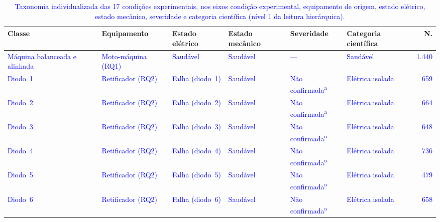 \documentclass[times,final]{elsarticle}
\begin{document}
\begin{table}[H]
    \centering
    \footnotesize
    \caption{\textcolor{blue}{Taxonomia individualizada das 17 condições experimentais, nos eixos condição experimental, equipamento de origem, estado elétrico, estado mecânico, severidade e categoria científica (nível 1 da leitura hierárquica).}}
    \label{tab:res_taxonomia_hierarquica}
    \begin{tabular}{@{}p{3.4cm}p{1.9cm}p{2.0cm}p{2.3cm}p{1.7cm}p{1.7cm}r@{}}
        \toprule
        \textbf{Classe} & \textbf{Equipamento} & \textbf{Estado elétrico} & \textbf{Estado mecânico} & \textbf{Severidade} & \textbf{Categoria científica} & \textbf{N.} \\
        \midrule
        \textcolor{blue}{Máquina balanceada e alinhada} & \textcolor{blue}{Moto-máquina (RQ1)} & \textcolor{blue}{Saudável} & \textcolor{blue}{Saudável} & \textcolor{blue}{---} & \textcolor{blue}{Saudável} & \textcolor{blue}{1.440} \\
        \addlinespace
        \textcolor{blue}{Diodo~1} & \textcolor{blue}{Retificador (RQ2)} & \textcolor{blue}{Falha (diodo~1)} & \textcolor{blue}{Saudável} & \textcolor{blue}{Não confirmada\textsuperscript{a}} & \textcolor{blue}{Elétrica isolada} & \textcolor{blue}{659} \\
        \textcolor{blue}{Diodo~2} & \textcolor{blue}{Retificador (RQ2)} & \textcolor{blue}{Falha (diodo~2)} & \textcolor{blue}{Saudável} & \textcolor{blue}{Não confirmada\textsuperscript{a}} & \textcolor{blue}{Elétrica isolada} & \textcolor{blue}{664} \\
        \textcolor{blue}{Diodo~3} & \textcolor{blue}{Retificador (RQ2)} & \textcolor{blue}{Falha (diodo~3)} & \textcolor{blue}{Saudável} & \textcolor{blue}{Não confirmada\textsuperscript{a}} & \textcolor{blue}{Elétrica isolada} & \textcolor{blue}{648} \\
        \textcolor{blue}{Diodo~4} & \textcolor{blue}{Retificador (RQ2)} & \textcolor{blue}{Falha (diodo~4)} & \textcolor{blue}{Saudável} & \textcolor{blue}{Não confirmada\textsuperscript{a}} & \textcolor{blue}{Elétrica isolada} & \textcolor{blue}{736} \\
        \textcolor{blue}{Diodo~5} & \textcolor{blue}{Retificador (RQ2)} & \textcolor{blue}{Falha (diodo~5)} & \textcolor{blue}{Saudável} & \textcolor{blue}{Não confirmada\textsuperscript{a}} & \textcolor{blue}{Elétrica isolada} & \textcolor{blue}{479} \\
        \textcolor{blue}{Diodo~6} & \textcolor{blue}{Retificador (RQ2)} & \textcolor{blue}{Falha (diodo~6)} & \textcolor{blue}{Saudável} & \textcolor{blue}{Não confirmada\textsuperscript{a}} & \textcolor{blue}{Elétrica isolada} & \textcolor{blue}{658} \\

\end{tabular}
\end{table}
\end{document}
